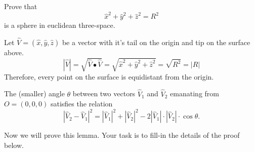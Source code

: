 \documentclass{ximera}
\begin{document}
\begin{problem}
  Prove that
  \[
  \hat{x}^2 + \hat{y}^2 + \hat{z}^2 = R^2
  \]
  is a sphere in euclidean three-space.
\begin{freeResponse}
Let $\hat{V}= \left(\hat{x},\hat{y}, \hat{z}\right)$ be a vector with it's tail on the origin and tip on the surface above.
\[
\left\vert \hat{V}\right\vert = \sqrt{\hat{V}\bullet \hat{V}} = \sqrt{ \hat{x}^2+\hat{y}^2 + \hat{z}^2}= \sqrt{R^2} = \left\vert R \right\vert
\] 
Therefore, every point on the surface is equidistant from the origin.
\end{freeResponse}  
\end{problem}


\begin{lemma}
\label{110} The (smaller) angle $\theta$ between two
vectors $\hat{V}_{1}$ and $\hat{V}_{2}$ emanating from $O=\left(
0,0,0\right)  $ satisfies the relation%
\[
\left\vert \hat{V}_{2}-\hat{V}_{1}\right\vert ^{2}=\left\vert \hat{V}%
_{1}\right\vert ^{2}+\left\vert \hat{V}_{2}\right\vert ^{2}-2\left\vert
\hat{V}_{1}\right\vert \cdot\left\vert \hat{V}_{2}\right\vert \cdot
\cos\theta.
\]
\end{lemma}

Now we will prove this lemma. Your task is to fill-in the details of
the proof below.
\end{document}
